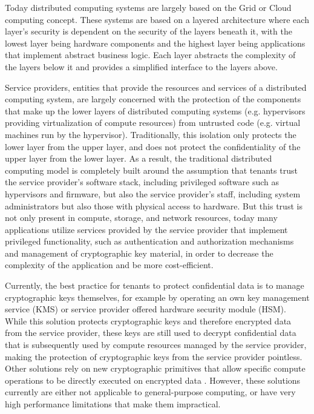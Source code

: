 Today distributed computing systems are largely based on the Grid or Cloud
computing concept. These systems are based on a layered architecture where each
layer's security is dependent on the security of the layers beneath it, with the
lowest layer being hardware components and the highest layer being applications
that implement abstract business logic. Each layer abstracts the complexity of
the layers below it and provides a simplified interface to the layers above.

Service providers, entities that provide the resources and services of a
distributed computing system, are largely concerned with the protection of the
components that make up the lower layers of distributed computing systems (e.g.
hypervisors providing virtualization of compute resources) from untrusted code
(e.g. virtual machines run by the hypervisor). Traditionally, this isolation
only protects the lower layer from the upper layer, and does not protect the
confidentiality of the upper layer from the lower layer. As a result, the
traditional distributed computing model is completely built around the
assumption that tenants trust the service provider's software stack, including
privileged software such as hypervisors and firmware, but also the service
provider's staff, including system administrators but also those with physical
access to hardware. But this trust is not only present in compute, storage, and
network resources, today many applications utilize services provided by the
service provider that implement privileged functionality, such as authentication
and authorization mechanisms and management of cryptographic key material, in
order to decrease the complexity of the application and be more cost-efficient.

Currently, the best practice for tenants to protect confidential data is to
manage cryptographic keys themselves, for example by operating an own key
management service (KMS) or service provider offered hardware security module
(HSM). While this solution protects cryptographic keys and therefore encrypted
data from the service provider, these keys are still used to decrypt
confidential data that is subsequently used by compute resources managed by the
service provider, making the protection of cryptographic keys from the service
provider pointless. Other solutions rely on new cryptographic primitives that
allow specific compute operations to be directly executed on encrypted data
\cite{monique2013homomorphicencryption, bellare2007searchableencryption}.
However, these solutions currently are either not applicable to general-purpose
computing, or have very high performance limitations that make them impractical.

